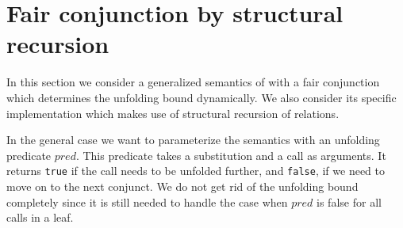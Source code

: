 \section{Fair conjunction by structural recursion}
\label{sec:structural}

In this section we consider a generalized semantics of \mk with a fair conjunction which determines the unfolding bound dynamically. We also consider its specific implementation
which makes use of structural recursion of relations.

In the general case we want to parameterize the semantics with an unfolding predicate $pred$. This predicate takes a substitution and a call as arguments. It returns \lstinline{true}
if the call needs to be unfolded further, and \lstinline{false}, if we need to move on to the next conjunct. We do not get rid of the unfolding bound completely since it is still needed to handle
the case when $pred$ is false for all calls in a leaf.

